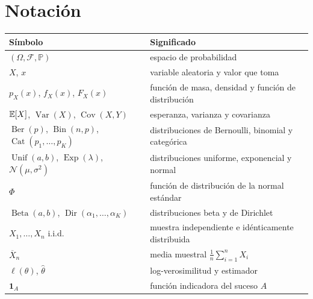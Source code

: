 \documentclass[11pt,a4paper,twoside,openany]{book}
\DeclareMathOperator{\Var}{Var}
\DeclareMathOperator{\Cov}{Cov}
\DeclareMathOperator{\Ber}{Ber}
\DeclareMathOperator{\Bin}{Bin}
\DeclareMathOperator{\Cat}{Cat}
\DeclareMathOperator{\Unif}{Unif}
\DeclareMathOperator{\Expo}{Exp}
\DeclareMathOperator{\BetaD}{Beta}
\DeclareMathOperator{\Dir}{Dir}
\newcommand{\N}{\mathcal{N}}
\newcommand{\PP}{\mathbb{P}}
\newcommand{\iid}{i.i.d.}
\newcommand{\Xbar}{\overline{X}}
\begin{document}
\section*{Notación}
\begin{center}
\begin{tabular}{@{}ll@{}}
\toprule
Símbolo & Significado \\
\midrule
$(\Omega,\mathcal{F},\PP)$ & espacio de probabilidad \\
$X$, $x$ & variable aleatoria y valor que toma \\
$p_X(x)$, $f_X(x)$, $F_X(x)$ & función de masa, densidad y función de distribución \\
$\mathbb{E}[X]$, $\Var(X)$, $\Cov(X,Y)$ & esperanza, varianza y covarianza \\
$\Ber(p)$, $\Bin(n,p)$, $\Cat(p_1,\dots,p_K)$ & distribuciones de Bernoulli, binomial y categórica \\
$\Unif(a,b)$, $\Expo(\lambda)$, $\N(\mu,\sigma^{2})$ & distribuciones uniforme, exponencial y normal \\
$\Phi$ & función de distribución de la normal estándar \\
$\BetaD(a,b)$, $\Dir(\alpha_1,\dots,\alpha_K)$ & distribuciones beta y de Dirichlet \\
$X_1,\dots,X_n$ \iid & muestra independiente e idénticamente distribuida \\
$\Xbar_n$ & media muestral $\frac1n\sum_{i=1}^{n}X_i$ \\
$\ell(\theta)$, $\hat\theta$ & log-verosimilitud y estimador \\
$\mathbf{1}_A$ & función indicadora del suceso $A$ \\
\bottomrule
\end{tabular}
\end{center}

\tableofcontents

\mainmatter






\appendix


\backmatter

\end{document}
